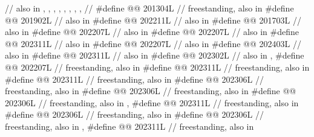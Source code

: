 \begin{codeblock}
  // also in , , , , , , , ,
  // 
#define @@                 201304L // freestanding, also in 
#define @@                         201902L // also in 
#define @@                          202211L // also in 
#define @@                        201703L // also in 
#define @@                          202207L // also in 
#define @@                          202207L // also in 
#define @@                            202311L // also in 
#define @@                     202207L // also in 
#define @@                       202403L // also in 
#define @@                      202311L // also in 
#define @@                        202302L // also in , 
#define @@                      202207L // freestanding, also in 
#define @@            202311L // freestanding, also in 
#define @@                202311L // freestanding, also in 
#define @@          202306L // freestanding, also in 
#define @@             202306L // freestanding, also in 
#define @@              202306L // freestanding, also in , 
#define @@              202311L // freestanding, also in 
#define @@               202306L // freestanding, also in 
#define @@                 202306L
  // freestanding, also in , 
#define @@             202311L // freestanding, also in 

\end{codeblock}
